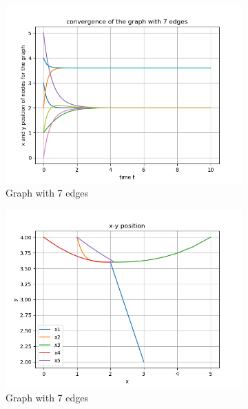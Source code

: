 \documentclass{article}
\begin{document}
\begin{problem}
    \begin{figure}
        \centering   
        \begin{subfigure}{0.4\textwidth}
            \includegraphics[width=\textwidth]{./img/Figure_5.png}
            \caption{Graph with 7 edges}
        \end{subfigure}
        \begin{subfigure}{0.4\textwidth}
            \includegraphics[width=\textwidth]{./img/Figure_6.png}
            \caption{Graph with 7 edges}
        \end{subfigure}
        \begin{subfigure}{0.4\textwidth}

\end{subfigure}
\end{figure}
\end{problem}
\end{document}

